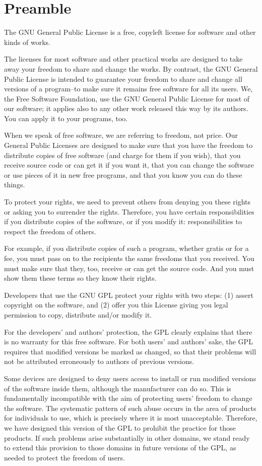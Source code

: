 \documentclass[letterpaper,10pt,english]{sphinxmanual}
\begin{document}
\section{Preamble}
\label{license:preamble}
The GNU General Public License is a free, copyleft license for
software and other kinds of works.

The licenses for most software and other practical works are designed
to take away your freedom to share and change the works.  By contrast,
the GNU General Public License is intended to guarantee your freedom to
share and change all versions of a program--to make sure it remains free
software for all its users.  We, the Free Software Foundation, use the
GNU General Public License for most of our software; it applies also to
any other work released this way by its authors.  You can apply it to
your programs, too.

When we speak of free software, we are referring to freedom, not
price.  Our General Public Licenses are designed to make sure that you
have the freedom to distribute copies of free software (and charge for
them if you wish), that you receive source code or can get it if you
want it, that you can change the software or use pieces of it in new
free programs, and that you know you can do these things.

To protect your rights, we need to prevent others from denying you
these rights or asking you to surrender the rights.  Therefore, you have
certain responsibilities if you distribute copies of the software, or if
you modify it: responsibilities to respect the freedom of others.

For example, if you distribute copies of such a program, whether
gratis or for a fee, you must pass on to the recipients the same
freedoms that you received.  You must make sure that they, too, receive
or can get the source code.  And you must show them these terms so they
know their rights.

Developers that use the GNU GPL protect your rights with two steps:
(1) assert copyright on the software, and (2) offer you this License
giving you legal permission to copy, distribute and/or modify it.

For the developers' and authors' protection, the GPL clearly explains
that there is no warranty for this free software.  For both users' and
authors' sake, the GPL requires that modified versions be marked as
changed, so that their problems will not be attributed erroneously to
authors of previous versions.

Some devices are designed to deny users access to install or run
modified versions of the software inside them, although the manufacturer
can do so.  This is fundamentally incompatible with the aim of
protecting users' freedom to change the software.  The systematic
pattern of such abuse occurs in the area of products for individuals to
use, which is precisely where it is most unacceptable.  Therefore, we
have designed this version of the GPL to prohibit the practice for those
products.  If such problems arise substantially in other domains, we
stand ready to extend this provision to those domains in future versions
of the GPL, as needed to protect the freedom of users.
\end{document}

